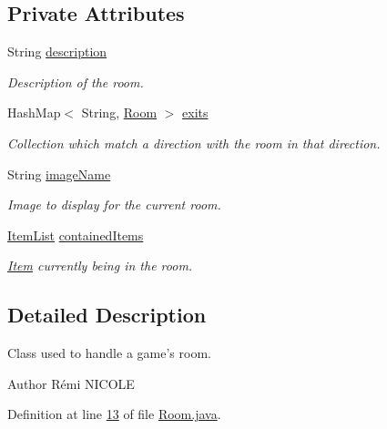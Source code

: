 \subsection*{Private Attributes}
\begin{DoxyCompactItemize}
\item 
String \hyperlink{classpkg__world_1_1Room_a029ab15b9217139d350f3a6980e49a93}{description}
\begin{DoxyCompactList}\small\item\em Description of the room. \end{DoxyCompactList}\item 
Hash\-Map$<$ String, \hyperlink{classpkg__world_1_1Room}{Room} $>$ \hyperlink{classpkg__world_1_1Room_a7ddc883b0f176f4e8a866dfb4af66167}{exits}
\begin{DoxyCompactList}\small\item\em Collection which match a direction with the room in that direction. \end{DoxyCompactList}\item 
String \hyperlink{classpkg__world_1_1Room_a5d803cae18b95d7a4fc5243fd13ae236}{image\-Name}
\begin{DoxyCompactList}\small\item\em Image to display for the current room. \end{DoxyCompactList}\item 
\hyperlink{classpkg__world_1_1ItemList}{Item\-List} \hyperlink{classpkg__world_1_1Room_a3a9b7b85c95e41654c017e1adb74a49b}{contained\-Items}
\begin{DoxyCompactList}\small\item\em \hyperlink{classpkg__world_1_1Item}{Item} currently being in the room. \end{DoxyCompactList}\end{DoxyCompactItemize}


\subsection{Detailed Description}
Class used to handle a game's room. 

\begin{DoxyAuthor}{Author}
Rémi N\-I\-C\-O\-L\-E 
\end{DoxyAuthor}


Definition at line \hyperlink{Room_8java_source_l00013}{13} of file \hyperlink{Room_8java_source}{Room.\-java}.



